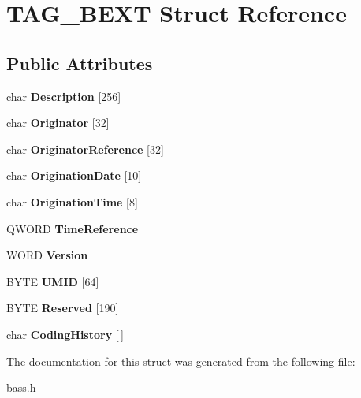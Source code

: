 \section{T\+A\+G\+\_\+\+B\+E\+X\+T Struct Reference}
\label{struct_t_a_g___b_e_x_t}
\subsection*{Public Attributes}
\begin{DoxyCompactItemize}
\item 
char {\bfseries Description} [256]\label{struct_t_a_g___b_e_x_t_a481d2bd43b1711c5cb94144f063dd2b9}

\item 
char {\bfseries Originator} [32]\label{struct_t_a_g___b_e_x_t_a1b5e44f36adf8bd6bc6c3c81a296832e}

\item 
char {\bfseries Originator\+Reference} [32]\label{struct_t_a_g___b_e_x_t_a690a6456888880532ea8fcb1e62c7e8d}

\item 
char {\bfseries Origination\+Date} [10]\label{struct_t_a_g___b_e_x_t_ab3e2ec23adcd6b882a0bc84b8cb0d6f3}

\item 
char {\bfseries Origination\+Time} [8]\label{struct_t_a_g___b_e_x_t_a28e039d60c9ba9e4f559244e7e237dc3}

\item 
Q\+W\+O\+R\+D {\bfseries Time\+Reference}\label{struct_t_a_g___b_e_x_t_abae4961b0ac06cad4e7df0b0ad80c4df}

\item 
W\+O\+R\+D {\bfseries Version}\label{struct_t_a_g___b_e_x_t_a2f1751b9b0e537006ce9ee3c1dd001f9}

\item 
B\+Y\+T\+E {\bfseries U\+M\+I\+D} [64]\label{struct_t_a_g___b_e_x_t_a3e94847d78dcda770eb530b554aba777}

\item 
B\+Y\+T\+E {\bfseries Reserved} [190]\label{struct_t_a_g___b_e_x_t_a8333be7681d3182a55a1e4d0ad7bedec}

\item 
char {\bfseries Coding\+History} [$\,$]\label{struct_t_a_g___b_e_x_t_aa0a77ec791071828c559b4d974f71aa5}

\end{DoxyCompactItemize}


The documentation for this struct was generated from the following file\+:\begin{DoxyCompactItemize}
\item 
bass.\+h\end{DoxyCompactItemize}
